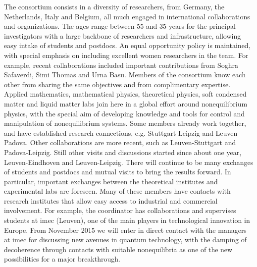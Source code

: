 The consortium consists in a diversity of researchers, from Germany, the
Netherlands, Italy and Belgium, all much engaged in international collaborations and
organizations.
%
The ages range between 55 and 35 years for the principal investigators with a large backbone
of researchers and infrastructure, allowing easy intake of students and postdocs. An equal
opportunity policy is maintained, with special emphasis on including excellent women
researchers in the team. For example, recent collaborations included important contributions from Soghra Safaverdi, Simi Thomas and Urna Basu.  Members of the
consortium know each other from sharing the same objectives and from complimentary
expertise.
%
Applied mathematics, mathematical physics, theoretical physics, soft condensed matter and
liquid matter labs join here in a global effort around nonequilibrium physics, with the
special aim of developing knowledge and tools for control and manipulation of nonequilibrium
systems. Some members already work together, and have established research connections,
e.g. Stuttgart-Leipzig and Leuven-Padova.  Other collaborations are more
recent, such as Leuven-Stuttgart and Padova-Leipzig.  Still other visits and discussions
started since about one year, Leuven-Eindhoven and Leuven-Leipzig.
%
There will continue to be many exchanges of students and postdocs and mutual visits to bring
the results forward.  In particular, important exchanges between the theoretical institutes
and experimental labs are foreseen.  Many of these members have contacts with research
institutes that allow easy access to industrial and commercial involvement.  For example,
the coordinator has collaborations and supervises students at imec (Leuven), one of the main
players in technological innovation in Europe. From November 2015 we will enter in direct
contact with the managers at imec for discussing new avenues in quantum technology, with the
damping of decoherence through contacts with suitable nonequilibria as one of the new possibilities for a major breakthrough.



